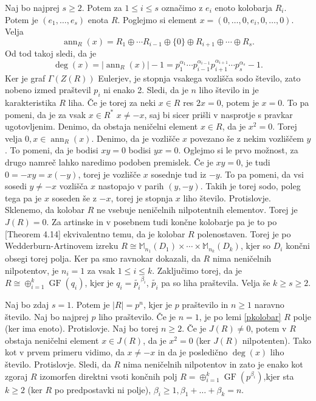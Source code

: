 \documentclass[a4paper, 12pt]{amsart}
\theoremstyle{definition} %
\theoremstyle{plain} %
\newcommand{\M}{\mathbb M}
\DeclareMathOperator{\ann}{ann}
\DeclareMathOperator{\GF}{GF}
\begin{document}
Naj bo najprej $s\ge 2$. Potem za $1 \le i \le s$ označimo z $e_i$ enoto kolobarja $R_i$. Potem je $(e_1, \dots, e_s)$ enota $R$. Poglejmo si element $x = (0,\dots, 0,e_i,0,\dots,0)$. Velja
$$
\ann_R(x) = R_1\oplus  \cdots R_{i-1} \oplus \{ 0 \} \oplus R_{i+1} \oplus \cdots \oplus R_{s}.
$$  
Od tod takoj sledi, da je
$$
\deg(x) = |\ann_R(x)| - 1 = p_1^{\alpha_1} \cdots p_{i-1}^{\alpha_{i-1}} p_{i+1}^{\alpha_{i+1}} \cdots p_s^{\alpha_s} - 1.
$$
Ker je graf $\Gamma(Z(R))$ Eulerjev, je stopnja vsakega vozlišča sodo število, zato nobeno izmed praštevil $p_i$ ni enako 2. Sledi, da je $n$ liho število in je karakteristika $R$ liha. Če je torej za neki $x\in R$ res $2x = 0$, potem je $x=0$. To pa pomeni, da je za vsak $x\in R^*$ $x\neq -x$, saj bi sicer prišli v nasprotje s pravkar ugotovljenim. Denimo, da obstaja neničelni element $x\in R$, da je $x^2 = 0$. Torej velja $0,x\in \ann_R(x)$. Denimo, da je vozlišče $x$ povezano še z nekim vozliščem $y$. To pomeni, da je bodisi $xy=0$ bodisi $yx=0$. Oglejmo si le prvo možnost, za drugo namreč lahko naredimo podoben premislek. Če je $xy = 0$, je tudi $0=-xy=x(-y)$, torej je vozlišče $x$ sosednje tud iz $-y$. To pa pomeni, da vsi sosedi $y\neq -x$ vozlišča $x$ nastopajo v parih $(y,-y)$. Takih je torej sodo, poleg tega pa je $x$ soseden še z $-x$, torej je stopnja $x$ liho število. Protislovje. Sklenemo, da kolobar $R$ ne vsebuje neničelnih nilpotentnih elementov. Torej je $J(R)=0$. Za artinske in v posebnem tudi končne kolobarje pa je to po \cite{Lam}[Theorem 4.14] ekvivalentno temu, da je kolobar $R$ polenostaven. Torej je po Wedderburn-Artinovem izreku $R\cong \M_{n_1}(D_1)\times \cdots \times \M_{n_k}(D_k)$, kjer so $D_i$ končni obsegi torej polja. Ker pa smo ravnokar dokazali, da $R$ nima neničelnih nilpotentov, je $n_i= 1$ za vsak $1\le i \le k$. Zaključimo torej, da je $R\cong \oplus_{i=1}^k \GF(q_i)$, kjer je $q_i = \tilde{p_i}^{\beta_i}$, $\tilde{p_i}$ pa so liha praštevila. Velja še $k\ge s \ge 2$.

Naj bo zdaj $s=1$. Potem je $|R| = p^n$, kjer je $p$ praštevilo in $n\ge1$ naravno število. Naj bo najprej $p$ liho praštevilo. Če je $n=1$, je po lemi \ref{pkolobar} $R$ polje (ker ima enoto). Protislovje. Naj bo torej $n\ge 2$. Če je $J(R) \neq 0$, potem v $R$ obstaja neničelni element $x\in J(R)$, da je $x^2 = 0$ (ker $J(R)$ nilpotenten). Tako kot v prvem primeru vidimo, da $x\neq -x$ in da je posledično $\deg(x)$ liho število. Protislovje. Sledi, da $R$ nima neničelnih nilpotentov in  zato je enako kot zgoraj $R$ izomorfen direktni vsoti končnih polj $R=\oplus_{i=1}^k \GF(p^{\beta_i})$,kjer sta  $k\ge 2$ (ker $R$ po predpostavki ni polje), $\beta_i \ge 1, \beta_1 + \dots + \beta_k = n$.
\end{document}
